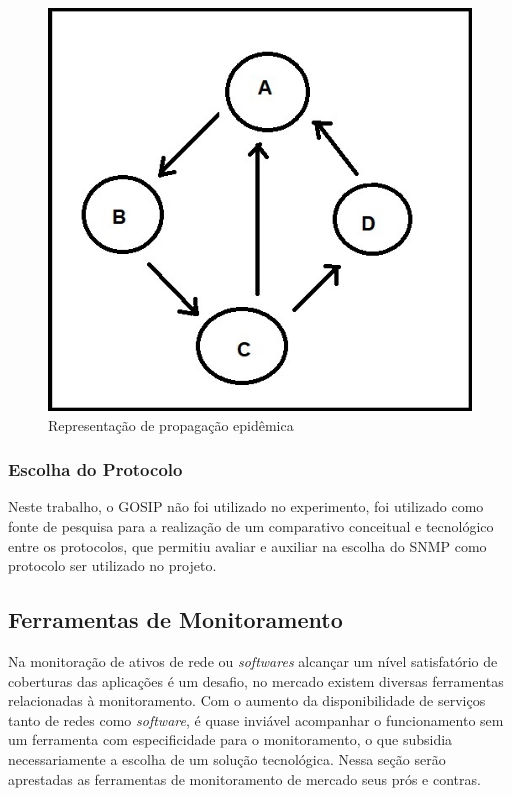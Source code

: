 \begin{figure}[H]
	\begin{center}
	\includegraphics[scale = 0.70]{img/gosip.jpg}
		\caption{Representação de propagação epidêmica   }
		\label{fun:fig:gosip}
	\end{center}
\end{figure}

\subsubsection{Escolha do Protocolo}

Neste trabalho, o \acrshort{GOSIP} não foi utilizado no experimento, foi utilizado como fonte de pesquisa para a realização de um comparativo conceitual e  tecnológico entre os protocolos, que permitiu avaliar e auxiliar na escolha do \acrshort{SNMP} como protocolo ser utilizado no projeto. 


\subsection{Ferramentas de Monitoramento}

Na monitoração de ativos de rede ou \textit{softwares} alcançar um nível satisfatório de coberturas das aplicações é um desafio, no mercado existem diversas ferramentas relacionadas à monitoramento. Com o aumento da disponibilidade de serviços tanto de redes como \textit{software}, é quase inviável acompanhar o funcionamento sem um ferramenta com especificidade para o monitoramento, o que subsidia necessariamente a escolha de um solução tecnológica. Nessa seção serão aprestadas as ferramentas de monitoramento de mercado seus prós e contras.

